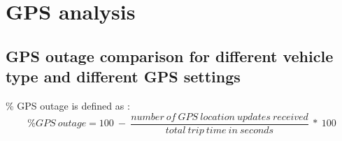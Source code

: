 \documentclass[12pt]{report}
\begin{document}




 \chapter{GPS analysis}
\section{GPS outage comparison for different vehicle type and different GPS settings}
\label{sec:gps_outage}
\% GPS outage is defined as :
\begin{equation}\label{gps_outage_eqn}
  \%GPS\  outage = 100 \  - \  \frac{number\  of\  GPS\  location\  updates\  received}{total\  trip\  time\  in\  seconds}\  *\  100
\end{equation}
\end{document}

